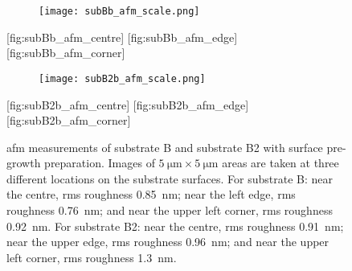 \begin{figure}[htbp]
    \centering
    \begin{subfigure}[b]{0.032\linewidth}
        \label{fig:subBb_afm_scale}\captionsetup{list=no}
        \texttt{[image: subBb\_afm\_scale.png]}
    \end{subfigure}
    \hfill
    [fig:subBb_afm_centre]%
    \hfill
    [fig:subBb_afm_edge]%
    \hfill
    [fig:subBb_afm_corner] %
    \par\bigskip
    \begin{subfigure}[b]{0.032\linewidth}
        \label{fig:subB2b_afm_scale}\captionsetup{list=no}
        \texttt{[image: subB2b\_afm\_scale.png]}
    \end{subfigure}
    \hfill
    [fig:subB2b_afm_centre]
    \hfill
    [fig:subB2b_afm_edge]
    \hfill
    [fig:subB2b_afm_corner]
    \caption[\Ac{afm} of substrate B and substrate B2 with surface pre-growth preparation.]{\Ac{afm} measurements of substrate B and substrate B2 with surface pre-growth preparation. Images of $\SI{5}{\micro\metre}\times\SI{5}{\micro\metre}$ areas are taken at three different locations on the substrate surfaces. For substrate B:  near the centre, \ac{rms} roughness \SI{0.85}{\nano\metre};  near the left edge, \ac{rms} roughness \SI{0.76}{\nano\metre}; and  near the upper left corner, \ac{rms} roughness \SI{0.92}{\nano\metre}. For substrate B2:  near the centre, \ac{rms} roughness \SI{0.91}{\nano\metre};  near the upper edge, \ac{rms} roughness \SI{0.96}{\nano\metre}; and  near the upper left corner, \ac{rms} roughness \SI{1.3}{\nano\metre}.}\label{fig:subBb_and_subB2_afm}
\end{figure} %


